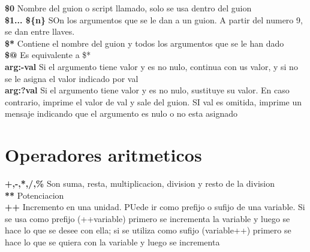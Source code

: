 \documentclass[11pt]{article}
\begin{document}
\vspace{3mm}

\hspace{2cm} \textbf{\$0}\hspace{2cm} Nombre del guion o script llamado, solo se usa dentro del guion\\

\hspace{2cm} \textbf{\$1... \$\{n\}}\hspace{2cm}
SOn los argumentos que se le dan a un guion. A partir del numero 9, se dan entre llaves. \\

\hspace{2cm} \textbf{\$*}\hspace{2cm} Contiene el nombre del guion y todos los argumentos que se le han dado\\

\hspace{2cm} \textbf{\$@}\hspace{2cm} Es equivalente a \$*\\

\hspace{2cm} \textbf{arg:-val}\hspace{2cm} Si el argumento tiene valor y es no nulo, continua con us valor, y si no se le asigna el valor indicado por val\\

\hspace{2cm} \textbf{arg:?val}\hspace{2cm} Si el argumento tiene valor y es no nulo, sustituye su valor. En caso contrario, imprime el valor de val y sale del guion. SI val es omitida, imprime un mensaje indicando que el argumento es nulo o no esta asignado \\

\section{Operadores aritmeticos}

\textbf{+,-,*,/,\%} \hspace{2cm} Son suma, resta, multiplicacion, division y resto de la division\\

\textbf{**}\hspace{2cm} Potenciacion\\

\textbf{++} \hspace{2cm} Incremento en una unidad. PUede ir como prefijo o sufijo de una variable. Si se usa como prefijo (++variable) primero se incrementa la variable y luego se hace lo que se desee con ella; si se utiliza como sufijo (variable++) primero se hace lo que se quiera con la variable y luego se incrementa \\
\end{document}
